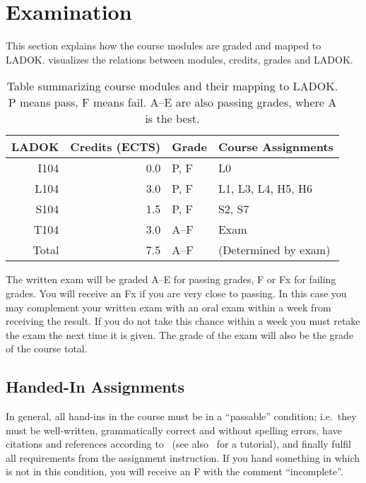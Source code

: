 \section{Examination}
\label{Examination}

This section explains how the course modules are graded and mapped to LADOK\@.
 visualizes the relations between modules, credits, grades and 
LADOK\@.

\begin{table}
  \centering
  \caption{%
    Table summarizing course modules and their mapping to LADOK\@.
    P means pass, F means fail.
    A--E are also passing grades, where A is the best.
  }\label{LADOKTable}
  \begin{tabular}{rrll}
    \toprule
    LADOK & Credits (ECTS)  & Grade       & Course Assignments\\
    \midrule
    I104  & 0.0             & P, F        & L0\\
    L104  & 3.0             & P, F        & L1, L3, L4, H5, H6\\
    S104  & 1.5             & P, F        & S2, S7\\
    T104  & 3.0             & A--F        & Exam\\
    \midrule
    Total & 7.5             & A--F        & (Determined by exam)\\
    \bottomrule
  \end{tabular}
\end{table}

The written exam will be graded A--E for passing grades, F or Fx for failing 
grades.
You will receive an Fx if you are very close to passing.
In this case you may complement your written exam with an oral exam within 
a week from receiving the result.
If you do not take this chance within a week you must retake the exam the next 
time it is given.
The grade of the exam will also be the grade of the course total.

\subsection{Handed-In Assignments}                                              

In general, all hand-ins in the course must be in a \enquote{passable} 
condition; i.e.\ they must be well-written, grammatically correct and without 
spelling errors, have citations and references according to~\cite{IEEEcitation} 
(see also~\cite{PurdueCitation} for a tutorial), and finally fulfil all 
requirements from the assignment instruction.
If you hand something in which is not in this condition, you will receive an 
F with the comment \enquote{incomplete}.

